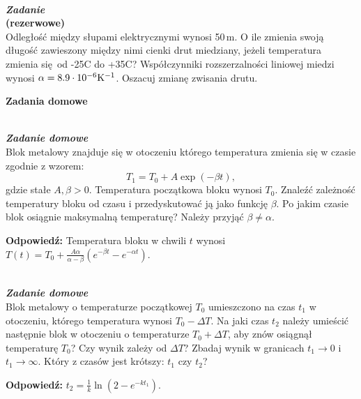\documentclass[11pt,a4paper]{article}
\newcounter{zadanie}\newcommand{\zadanie}[1][]{\addtocounter{zadanie}{1} ~\\  {\bf \emph{Zadanie \arabic{zadanie} #1 }} \\}
\newcounter{zaddom}\newcommand{\zaddom}[1][]{\addtocounter{zaddom}{1} ~\\  {\bf \emph{Zadanie domowe \arabic{zaddom} #1 }} \\}
\begin{document}
\vskip 2pt
\zadanie {\bf (rezerwowe)} \\
Odległość między słupami elektrycznymi wynosi 50\,m.
O ile zmienia swoją długość zawieszony między nimi cienki drut miedziany,
jeżeli temperatura zmienia się od -25\degree C do +35\degree C?
Współczynniki rozszerzalności liniowej miedzi wynosi $\alpha = 8.9\cdot 10^{-6} {\rm K}^{-1}$.
Oszacuj zmianę zwisania drutu.


\vskip 5pt



\vspace*{15mm}
\begin{centering}
\bf{ Zadania domowe } \\[1mm]
\end{centering}

\zaddom 
Blok metalowy znajduje się w otoczeniu
którego temperatura zmienia się w czasie zgodnie z wzorem:\\
\[T_1=T_0+A\exp(-\beta t),\] gdzie stałe $A,\beta>0$. 
Temperatura początkowa bloku wynosi $T_0$. Znaleźć zależność
temperatury bloku od czasu i przedyskutować ją jako funkcję
$\beta$. Po jakim czasie blok osiągnie maksymalną
temperaturę? Należy przyjąć $\beta \ne \alpha$.

\vskip 10pt

\textbf{Odpowiedź:} Temperatura bloku w chwili $t$ wynosi $T(t) = T_0 + \frac{A\alpha}{\alpha - \beta}\left(e^{-\beta t} - e^{-\alpha t}\right)$.


\zaddom
Blok metalowy o temperaturze początkowej $T_0$ umieszczono na czas $t_1$ w otoczeniu,
którego temperatura wynosi $T_0-\Delta T$. Na jaki czas $t_2$ należy umieścić następnie blok
w otoczeniu o temperaturze $T_0+\Delta T$, aby znów osiągnął temperaturę $T_0$?
Czy wynik zależy od $\Delta T$? 
Zbadaj wynik w granicach $t_1\rightarrow 0$ i $t_1\rightarrow \infty$. 
Który z czasów jest krótszy: $t_1$ czy $t_2$?

\vskip 10pt

\textbf{Odpowiedź:} $t_2 = \frac{1}{k} \ln \left(2 - e^{-k t_1}\right)$. 

\end{document}
